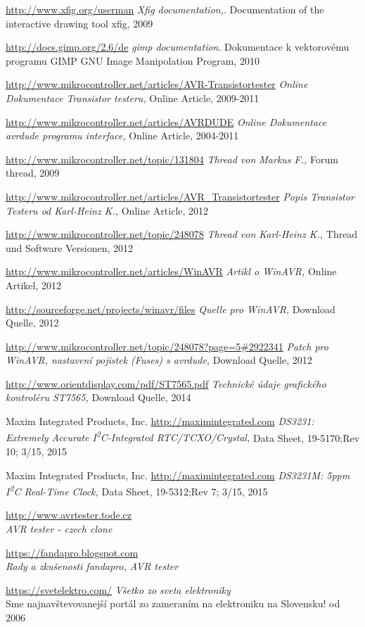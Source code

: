 \documentclass[pdftex,12pt,a4paper,oneside,czech]{report}
\begin{document}
\begin{thebibliography}{99}
\url{http://www.xfig.org/userman}
\emph{Xfig documentation,}.
Documentation of the interactive drawing tool xfig,
2009

\url{http://docs.gimp.org/2.6/de}
\emph{gimp documentation}.
Dokumentace k vektorovému programu GIMP GNU Image Manipolation Program,
2010

\url{http://www.mikrocontroller.net/articles/AVR-Transistortester}
\emph{Online Dokumentace Transistor testeru,}
Online Article,
2009-2011

\url{http://www.mikrocontroller.net/articles/AVRDUDE}
\emph{Online Dokumentace avrdude programu interface,}
Online Article,
2004-2011

\url{http://www.mikrocontroller.net/topic/131804}
\emph{Thread von Markus F.,}
Forum thread, 
2009

\url{http://www.mikrocontroller.net/articles/AVR\_Transistortester}
\emph{Popis Transistor Testeru od Karl-Heinz K.,}
Online Article,
2012

\url{http://www.mikrocontroller.net/topic/248078}
\emph{Thread von Karl-Heinz K.,}
Thread und Software Versionen,
2012

\url{http://www.mikrocontroller.net/articles/WinAVR}
\emph{Artikl o WinAVR,}
Online Artikel,
2012

\url{http://sourceforge.net/projects/winavr/files}
\emph{Quelle pro WinAVR,}
Download Quelle,
2012

\url{http://www.mikrocontroller.net/topic/248078?page=5#2922341}
\emph{Patch pro WinAVR, nastavení pojistek (Fuses) s avrdude,}
Download Quelle,
2012

\url{http://www.orientdisplay.com/pdf/ST7565.pdf}
\emph{Technické údaje grafického kontroléru ST7565,}
Download Quelle,
2014

Maxim Integrated Products, Inc.
\url{http://maximintegrated.com}
\emph{DS3231: Extremely Accurate I\textsuperscript{2}C-Integrated RTC/TCXO/Crystal,}
Data Sheet,
19-5170;Rev 10; 3/15,
2015

Maxim Integrated Products, Inc.
\url{http://maximintegrated.com}
\emph{DS3231M: 5ppm I\textsuperscript{2}C Real-Time Clock,}
Data Sheet,
19-5312;Rev 7; 3/15,
2015

\url{http://www.avrtester.tode.cz}\\
\emph{AVR tester - czech clone}

\url{https://fandapro.blogspot.com}\\
\emph{Rady a zkušenosti fandapro, AVR tester}

\url{https://svetelektro.com/}
\emph{Všetko zo sveta elektroniky}
\\
Sme najnavštevovanejší portál zo zameraním na elektroniku na Slovensku!
od 2006

\end{thebibliography}
\end{document}
